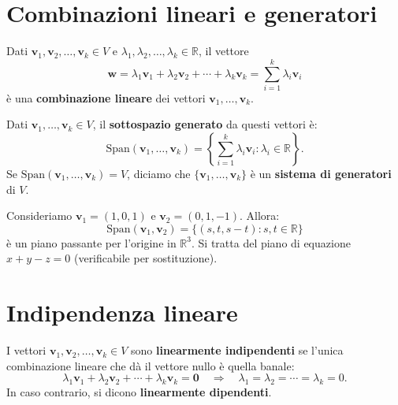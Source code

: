 \section{Combinazioni lineari e generatori}
\label{sec:combinazioni-lineari}

\begin{definitionbox}
Dati $\mathbf{v}_1, \mathbf{v}_2, \ldots, \mathbf{v}_k \in V$ e $\lambda_1, \lambda_2, \ldots, \lambda_k \in \mathbb{R}$, il vettore
\[ \mathbf{w} = \lambda_1 \mathbf{v}_1 + \lambda_2 \mathbf{v}_2 + \cdots + \lambda_k \mathbf{v}_k = \sum_{i=1}^{k} \lambda_i \mathbf{v}_i \]
è una \textbf{combinazione lineare} dei vettori $\mathbf{v}_1, \ldots, \mathbf{v}_k$.
\end{definitionbox}

\begin{definitionbox}
Dati $\mathbf{v}_1, \ldots, \mathbf{v}_k \in V$, il \textbf{sottospazio generato} da questi vettori è:
\[ \text{Span}(\mathbf{v}_1, \ldots, \mathbf{v}_k) = \left\{ \sum_{i=1}^{k} \lambda_i \mathbf{v}_i : \lambda_i \in \mathbb{R} \right\}. \]
Se $\text{Span}(\mathbf{v}_1, \ldots, \mathbf{v}_k) = V$, diciamo che $\{\mathbf{v}_1, \ldots, \mathbf{v}_k\}$ è un \textbf{sistema di generatori} di $V$.
\end{definitionbox}

\begin{examplebox}
Consideriamo $\mathbf{v}_1 = (1, 0, 1)$ e $\mathbf{v}_2 = (0, 1, -1)$. Allora:
\[ \text{Span}(\mathbf{v}_1, \mathbf{v}_2) = \{(s, t, s-t) : s, t \in \mathbb{R}\} \]
è un piano passante per l'origine in $\mathbb{R}^3$. Si tratta del piano di equazione $x + y - z = 0$ (verificabile per sostituzione).
\end{examplebox}

\section{Indipendenza lineare}
\label{sec:indipendenza}

\begin{definitionbox}
I vettori $\mathbf{v}_1, \mathbf{v}_2, \ldots, \mathbf{v}_k \in V$ sono \textbf{linearmente indipendenti} se l'unica combinazione lineare che dà il vettore nullo è quella banale:
\[ \lambda_1 \mathbf{v}_1 + \lambda_2 \mathbf{v}_2 + \cdots + \lambda_k \mathbf{v}_k = \mathbf{0} \quad \Longrightarrow \quad \lambda_1 = \lambda_2 = \cdots = \lambda_k = 0. \]
In caso contrario, si dicono \textbf{linearmente dipendenti}.
\end{definitionbox}

